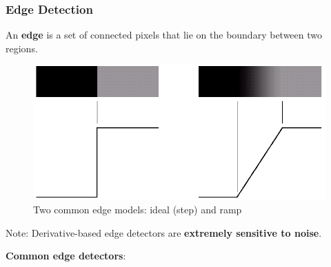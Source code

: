 \subsubsection*{Edge Detection}

An \textbf{edge} is a set of connected pixels that lie on the
boundary between two regions.

\begin{figure}[H]
  \centering
  \includegraphics[width=\linewidth]{images/edge_models.png}
  \caption{Two common edge models: ideal (step) and ramp}
\end{figure}

Note: Derivative-based edge detectors are \textbf{extremely sensitive to noise}.

\textbf{Common edge detectors}:

